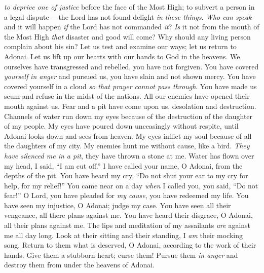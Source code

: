 \begin{biblechapter}
\verse \textit{to deprive one of justice} 
before the face of the Most High;
\verse to subvert a person in a legal dispute 
—the Lord has not found delight \textit{in these things}.
\verse \textit{Who can speak} and it will happen 
\textit{if} the Lord has not commanded \textit{it}?
\verse \textit{Is} it not from the mouth of the Most High 
\textit{that} disaster and good will come?
\verse Why should any living person complain 
about his sin?
\verse Let us test and examine our ways; 
let us return to Adonai.
\verse Let us lift up our hearts with our hands 
to God in the heavens.
\verse We ourselves have transgressed and rebelled, 
you have not forgiven.
\verse You have covered \textit{yourself} \textit{in anger} and pursued us, 
you have slain and not shown mercy.
\verse You have covered yourself in a cloud 
\textit{so that prayer cannot pass through}.
\verse You have made us scum and refuse 
in the midst of the nations.
\verse All our enemies 
have opened their mouth against us.
\verse Fear and a pit have come upon us, 
desolation and destruction.
\verse Channels of water run down my eyes 
because of the destruction of the daughter of my people.
\verse My eyes have poured down unceasingly 
without respite,
\verse until Adonai looks down 
and sees from heaven.
\verse My eyes inflict my soul 
because of all the daughters of my city.
\verse My enemies hunt me without cause, 
like a bird.
\verse \textit{They have silenced me in a pit}, 
they have thrown a stone at me.
\verse Water has flown over my head, 
I said, “I am cut off.”
\verse I have called your name, O Adonai, 
from the depths of the pit.
\verse You have heard my cry, “Do not shut your ear 
to my cry for help, for my relief!”
\verse You came near on a day \textit{when} I called you, 
you said, “Do not fear!”
\verse O Lord, you have pleaded for \textit{my cause}, 
you have redeemed my life.
\verse You have seen my injustice, O Adonai; 
judge my case.
\verse You have seen all their vengeance, 
all there plans against me.
\verse You have heard their disgrace, O Adonai, 
all their plans against me.
\verse The lips and meditation of my assailants 
\textit{are} against me all day long.
\verse Look at their sitting and their standing, 
I \textit{am} their mocking song.
\verse Return to them what is deserved, O Adonai, 
according to the work of their hands.
\verse Give them a stubborn heart; 
curse them!
\verse Pursue them \textit{in anger} and destroy them 
from under the heavens of Adonai.
\end{biblechapter}

